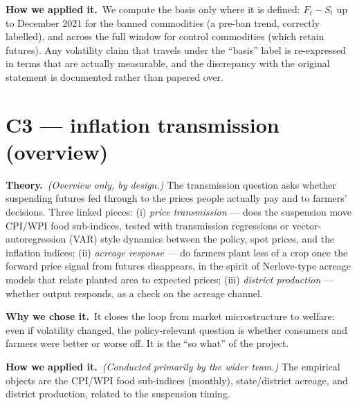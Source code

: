 \documentclass[11pt]{article}
\newcommand{\why}{\smallskip\noindent\textbf{Why we chose it.}\ }
\newcommand{\how}{\smallskip\noindent\textbf{How we applied it.}\ }
\newcommand{\thy}{\noindent\textbf{Theory.}\ }
\begin{document}
\how We compute the basis only where it is defined: $F_t - S_t$ up to December 2021 for the
banned commodities (a pre-ban trend, correctly labelled), and across the full window for
control commodities (which retain futures). Any volatility claim that travels under the
``basis'' label is re-expressed in terms that are actually measurable, and the discrepancy
with the original statement is documented rather than papered over.

\section{C3 --- inflation transmission (overview)}
\thy\emph{(Overview only, by design.)} The transmission question asks whether suspending
futures fed through to the prices people actually pay and to farmers' decisions. Three
linked pieces: (i) \emph{price transmission} --- does the suspension move CPI/WPI food
sub-indices, tested with transmission regressions or vector-autoregression (VAR) style
dynamics between the policy, spot prices, and the inflation indices; (ii) \emph{acreage
response} --- do farmers plant less of a crop once the forward price signal from futures
disappears, in the spirit of Nerlove-type acreage models that relate planted area to
expected prices; (iii) \emph{district production} --- whether output responds, as a check on
the acreage channel.

\why It closes the loop from market microstructure to welfare: even if volatility changed,
the policy-relevant question is whether consumers and farmers were better or worse off. It is
the ``so what'' of the project.

\how\emph{(Conducted primarily by the wider team.)} The empirical objects are the CPI/WPI
food sub-indices (monthly), state/district acreage, and district production, related to the
suspension timing.
\end{document}
